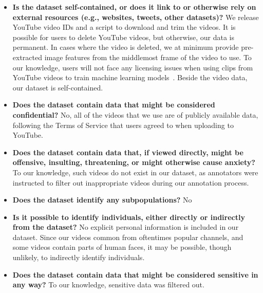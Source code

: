 \documentclass[runningheads]{llncs}
\begin{document}
\begin{itemize}
\item \textbf{Is the dataset self-contained, or does it link to or otherwise rely on
external resources (e.g., websites, tweets, other datasets)?} We release YouTube video IDs and a script to download and trim the videos. It is possible for users to delete YouTube videos, but otherwise, our data is permanent. In cases where the video is deleted, we at minimum provide pre-extracted image features from the middlemost frame of the video to use. To our knowledge, users will not face any licensing issues when using clips from YouTube videos to train machine learning models~\cite{zellers2021merlot,zellers2022merlotreserve}. Beside the video data, our dataset is self-contained. 

\item \textbf{Does the dataset contain data that might be considered confidential?} No, all of the videos that we use are of publicly available data, following the Terms of Service that users agreed to when uploading to YouTube.

\item \textbf{Does the dataset contain data that, if viewed directly, might be offensive, insulting, threatening, or might otherwise cause anxiety?} To our knowledge, such videos do not exist in our dataset, as annotators were instructed to filter out inappropriate videos during our annotation process. 

\item \textbf{Does the dataset identify any subpopulations?} No

\item \textbf{Is it possible to identify individuals, either directly or indirectly from the dataset?} No explicit personal information is included in our dataset. Since our videos common from oftentimes popular channels, and some videos contain parts of human faces, it may be possible, though unlikely, to indirectly identify individuals. 

\item \textbf{Does the dataset contain data that might be considered sensitive in
any way?} To our knowledge, sensitive data was filtered out. 

\end{itemize}
\end{document}
